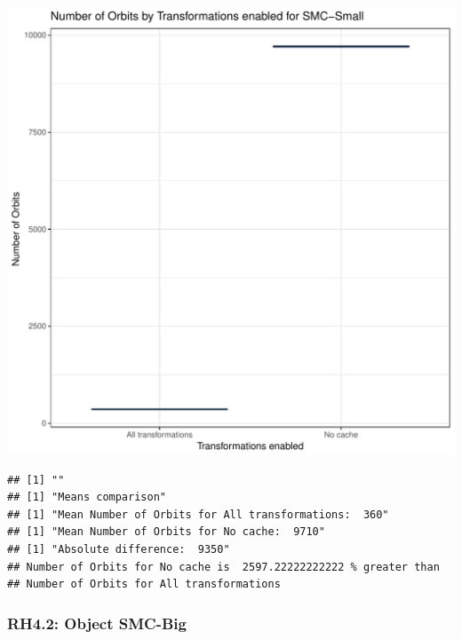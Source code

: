 \documentclass{article}\usepackage[]{graphicx}\usepackage[]{color}
\makeatletter
\def\maxwidth{ %
  \ifdim\Gin@nat@width>\linewidth
    \linewidth
  \else
    \Gin@nat@width
  \fi
}
\newenvironment{kframe}{%
 \def\at@end@of@kframe{}%
 \ifinner\ifhmode%
  \def\at@end@of@kframe{\end{minipage}}%
  \begin{minipage}{\columnwidth}%
 \fi\fi%
 \def\FrameCommand##1{\hskip\@totalleftmargin \hskip-\fboxsep
 \colorbox{shadecolor}{##1}\hskip-\fboxsep
     \hskip-\linewidth \hskip-\@totalleftmargin \hskip\columnwidth}%
 \MakeFramed {\advance\hsize-\width
   \@totalleftmargin\z@ \linewidth\hsize
   \@setminipage}}%
 {\par\unskip\endMakeFramed%
 \at@end@of@kframe}
\newenvironment{knitrout}{}{} %
\makeatother
\begin{document}
\begin{knitrout}
\color{fgcolor}
\includegraphics[width=\maxwidth]{figure/RH4_small-1} 
\begin{kframe}

{\ttfamily\noindent\bfseries\color{errorcolor}{\#\# Error in eval(expr, envir, enclos): object 'shap\_cashew\_small' not found}}\begin{verbatim}
## [1] ""
## [1] "Means comparison"
## [1] "Mean Number of Orbits for All transformations:  360"
## [1] "Mean Number of Orbits for No cache:  9710"
## [1] "Absolute difference:  9350"
## Number of Orbits for No cache is  2597.22222222222 % greater than 
## Number of Orbits for All transformations
\end{verbatim}
\end{kframe}
\end{knitrout}


\subsubsection{RH4.2: Object SMC-Big}
\end{document}

